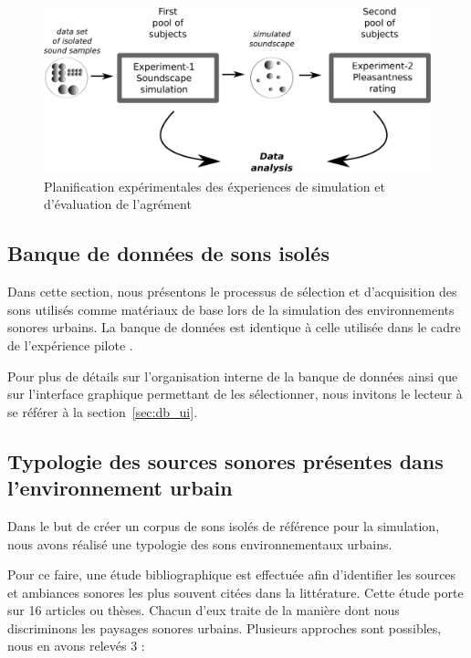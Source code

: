 \begin{figure}[t]
        \myfloatalign
        \includegraphics[width=.8\linewidth]{gfx/5-eps-converted-to}
        \caption{Planification expérimentales des éxperiences de simulation et d'évaluation de l'agrément}\label{fig:xp1_2}
\end{figure}



\subsection{Banque de données de sons isolés}

Dans cette section, nous présentons le processus de sélection et d'acquisition des sons utilisés comme matériaux de base lors de la simulation des environnements sonores urbains. La banque de données est identique à celle utilisée dans le cadre de l'expérience pilote \citep{lafay2013atiam,lafay2014new}. 

Pour plus de détails sur  l'organisation interne de la banque de données ainsi que sur l'interface graphique permettant de les sélectionner, nous invitons le lecteur à se référer à la section~\ref{sec:db_ui}.


\subsection{Typologie des sources sonores présentes dans l'environnement urbain}

Dans le but de créer un corpus de sons isolés de référence pour la simulation, nous avons réalisé une typologie des sons environnementaux urbains. 

Pour ce faire, une étude bibliographique est effectuée afin d'identifier les sources et ambiances sonores les plus souvent citées dans la littérature. Cette étude porte sur 16 articles ou thèses. Chacun d’eux traite de la manière dont nous discriminons les paysages sonores urbains. Plusieurs approches sont possibles, nous en avons relevés 3 :

